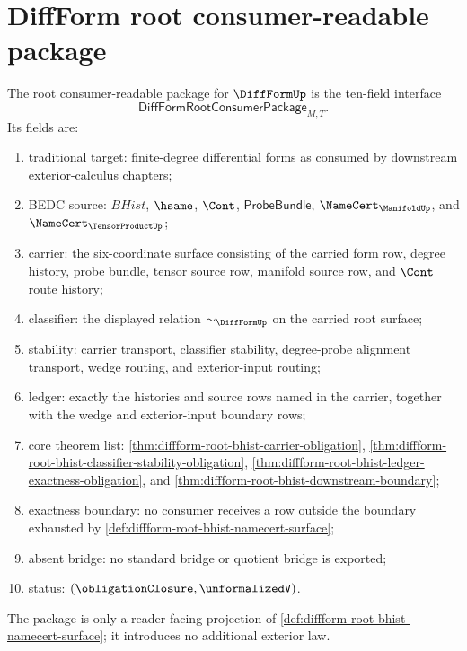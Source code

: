 \section{DiffForm root consumer-readable package}
\label{sec:diffform-root-consumer-readable-package}

\begin{definition}
\label{def:diffform-root-consumer-readable-package}
The root consumer-readable package for $\DiffFormUp$ is the ten-field
interface
$$
\mathsf{DiffFormRootConsumerPackage}_{M,T}.
$$
Its fields are:
\begin{enumerate}
  \item traditional target: finite-degree differential forms as consumed by
  downstream exterior-calculus chapters;
  \item BEDC source: $BHist$, $\hsame$, $\Cont$, $\mathsf{ProbeBundle}$,
  $\NameCert_{\ManifoldUp}$, and $\NameCert_{\TensorProductUp}$;
  \item carrier: the six-coordinate surface consisting of the carried form
  row, degree history, probe bundle, tensor source row, manifold source row,
  and $\Cont$ route history;
  \item classifier: the displayed relation $\sim_{\DiffFormUp}$ on the
  carried root surface;
  \item stability: carrier transport, classifier stability,
  degree-probe alignment transport, wedge routing, and exterior-input
  routing;
  \item ledger: exactly the histories and source rows named in the carrier,
  together with the wedge and exterior-input boundary rows;
  \item core theorem list:
  \autoref{thm:diffform-root-bhist-carrier-obligation},
  \autoref{thm:diffform-root-bhist-classifier-stability-obligation},
  \autoref{thm:diffform-root-bhist-ledger-exactness-obligation}, and
  \autoref{thm:diffform-root-bhist-downstream-boundary};
  \item exactness boundary: no consumer receives a row outside the boundary
  exhausted by \autoref{def:diffform-root-bhist-namecert-surface};
  \item absent bridge: no standard bridge or quotient bridge is exported;
  \item status: $(\obligationClosure,\unformalizedV)$.
\end{enumerate}
The package is only a reader-facing projection of
\autoref{def:diffform-root-bhist-namecert-surface}; it introduces no
additional exterior law.
\end{definition}

